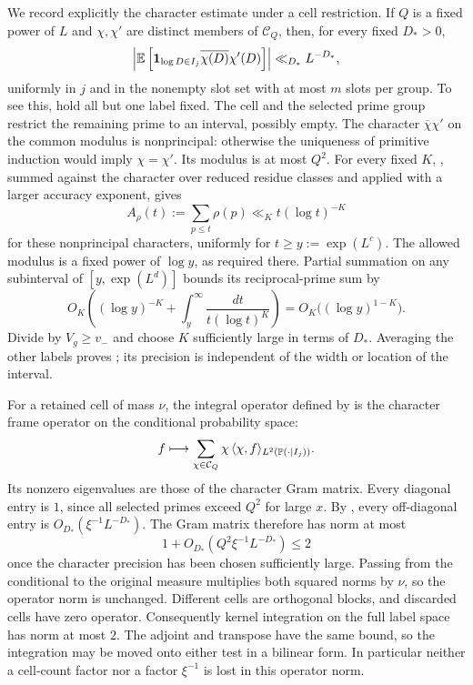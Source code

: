 We record explicitly the character estimate under a cell
restriction.  If $Q$ is a fixed power of $L$ and $\chi,\chi'$ are
distinct members of $\mathcal C_Q$, then, for every fixed $D_*>0$,
\begin{equation}\label{eq:ideal-character-cell}
 \left|\mathbb E\left[\mathbf 1_{\log D\in I_j}
          \overline{\chi(D)}\chi'(D)\right]\right|
 \ll_{D_*}L^{-D_*},
\end{equation}
uniformly in $j$ and in the nonempty slot set with at most $m$
slots per group.  To see this, hold all but one label fixed.
The cell and the selected prime group restrict the remaining
prime to an interval, possibly empty.  The character
$\overline\chi\chi'$ on the common modulus is nonprincipal:
otherwise the uniqueness of primitive induction would imply
$\chi=\chi'$.  Its modulus is at most $Q^2$.  For every fixed $K$,
 , summed against the character over reduced
residue classes and applied with a larger accuracy exponent, gives
\[
 A_\rho(t):=\sum_{p\leq t}\rho(p)
       \ll_K t(\log t)^{-K}
\]
for these nonprincipal characters, uniformly for
$t\geq y:=\exp(L^c)$.  The allowed modulus is a fixed power of
$\log y$, as required there.  Partial summation on any subinterval
of $[y,\exp(L^d)]$ bounds its reciprocal-prime sum by
\[
 O_K\left((\log y)^{-K}+
            \int_y^\infty\frac{dt}{t(\log t)^K}\right)
 =O_K\bigl((\log y)^{1-K}\bigr).
\]
Divide by $V_g\geq v_-$ and choose $K$ sufficiently large in terms
of $D_*$.  Averaging the other labels proves
; its precision is independent of
the width or location of the interval.

For a retained cell of mass $\nu$, the integral operator defined
by  is the character frame operator on
the conditional probability space:
\begin{equation}\label{eq:ideal-frame}
 f\longmapsto\sum_{\chi\in\mathcal C_Q}
       \chi\,\langle\chi,f\rangle_{L^2(\mathbb P(\cdot\mid I_j))}.
\end{equation}
Its nonzero eigenvalues are those of the character Gram matrix.
Every diagonal entry is $1$, since all selected primes exceed
$Q^2$ for large $x$.  By , every
off-diagonal entry is $O_{D_*}(\xi^{-1}L^{-D_*})$.
The Gram matrix therefore has norm at most
\begin{equation}\label{eq:ideal-gram-bound}
 1+O_{D_*}(Q^2\xi^{-1}L^{-D_*})\leq2
\end{equation}
once the character precision has been chosen sufficiently large.
Passing from the conditional to the original measure multiplies
both squared norms by $\nu$, so the operator norm is unchanged.
Different cells are orthogonal blocks, and discarded cells have
zero operator.  Consequently kernel integration on the full
label space has norm at most $2$.  The adjoint and transpose have
the same bound, so the integration may be moved onto either test
in a bilinear form.  In particular neither a cell-count factor
nor a factor $\xi^{-1}$ is lost in this operator norm.

